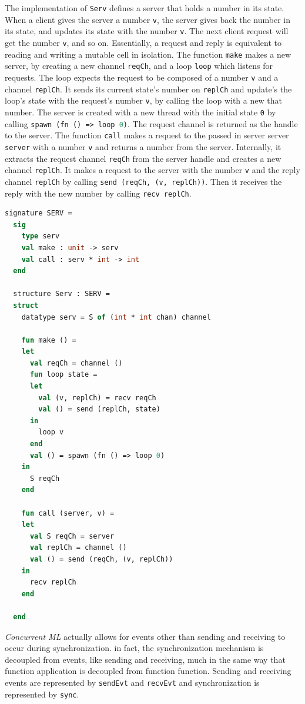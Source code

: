 \documentclass[letterpaper, 11pt]{extarticle}
\begin{document}
The implementation of \lstinline{Serv} defines a server that holds a number in its state.
When a client gives the server a number \lstinline{v}, the server gives back the number in
its state, and updates its state with the number \lstinline{v}.  The next client request will
get the number \lstinline{v}, and so on. Essentially, a request and reply is equivalent
to reading and writing a mutable cell in isolation. The function \lstinline{make} makes a new
server, by creating a new channel \lstinline{reqCh}, and a loop \lstinline{loop} which listens
for requests. The loop expects the request to be composed of a number \lstinline{v} and a
channel \lstinline{replCh}. It sends its current state's number on \lstinline{replCh} and
update's the loop's state with the request's number \lstinline{v}, by calling the loop with a
new that number. The server is created with a new thread with the initial state \lstinline{0}
by calling \lstinline[language=ML]{spawn (fn () => loop 0)}. The request channel is returned
as the handle to the server.  The function \lstinline{call} makes a request to the passed in
server server \lstinline{server} with a number \lstinline{v} and returns a number from the
server. Internally, it extracts the request channel \lstinline{reqCh} from the
server handle and creates a new channel \lstinline{replCh}. It makes a request to the server
with the number \lstinline{v} and the reply channel \lstinline{replCh} by calling
\lstinline{send (reqCh, (v, replCh))}. Then it receives the reply with the new number by
calling \lstinline{recv replCh}.


\begin{lstlisting}[language=ML, mathescape]
  signature SERV =
  sig 
    type serv
    val make : unit -> serv
    val call : serv * int -> int
  end

  structure Serv : SERV =
  struct 
    datatype serv = S of (int * int chan) channel 

    fun make () =
    let 
      val reqCh = channel ()
      fun loop state =
      let
        val (v, replCh) = recv reqCh
        val () = send (replCh, state)
      in
        loop v
      end
      val () = spawn (fn () => loop 0)
    in
      S reqCh
    end 

    fun call (server, v) =
    let 
      val S reqCh = server
      val replCh = channel () 
      val () = send (reqCh, (v, replCh))
    in
      recv replCh
    end

  end
\end{lstlisting}


\textit{Concurrent ML} actually allows for events other than sending and receiving to
occur during synchronization. in fact, the synchronization mechanism is decoupled from
events, like sending and receiving, much in the same way that function application is decoupled
from function function. Sending and receiving events are represented by \lstinline{sendEvt}
and \lstinline{recvEvt} and synchronization is represented by \lstinline{sync}.
\end{document}
